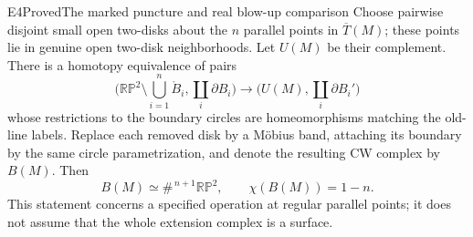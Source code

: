 \begin{resultenv}{E4}{Proved}{The marked puncture and real blow-up comparison}
Choose pairwise disjoint small open two-disks about the $n$ parallel points
in $\overline T(M)$; these points lie in genuine open two-disk neighborhoods.
Let $U(M)$ be their complement. There is a homotopy equivalence of pairs
\[
 \bigl(\mathbb {RP}^2\setminus\textstyle\bigcup_{i=1}^n\mathring B_i,
       \coprod_i\partial B_i\bigr)
 \longrightarrow
 \bigl(U(M),\coprod_i\partial B_i'\bigr)
\]
whose restrictions to the boundary circles are homeomorphisms matching the
old-line labels. Replace each removed disk by a M\"obius band, attaching its
boundary by the same circle parametrization, and denote the resulting CW
complex by $B(M)$. Then
\[
 B(M)\simeq\#^{\,n+1}\mathbb {RP}^2,
 \qquad\chi(B(M))=1-n.
\]
This statement concerns a specified operation at regular parallel points;
it does not assume that the whole extension complex is a surface.
\end{resultenv}

